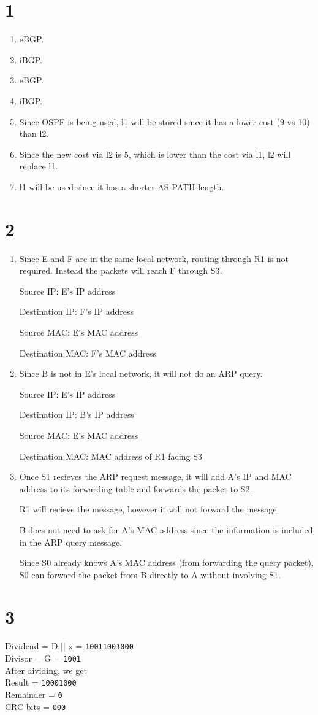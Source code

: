 \section*{1}
\begin{enumerate}[label=\alph*.]
    \item eBGP.
    \item iBGP.
    \item eBGP.
    \item iBGP.
    \item Since OSPF is being used, l1 will be stored since it has a lower cost (9 vs 10) than l2.
    \item Since the new cost via l2 is 5, which is lower than the cost via l1, l2 will replace l1.
    \item l1 will be used since it has a shorter AS-PATH length.
\end{enumerate}

\section*{2}
\begin{enumerate}[label=\alph*.]
    \item Since E and F are in the same local network, routing through R1 is not required. Instead the packets will reach F through S3.
    
    Source IP: E's IP address
    
    Destination IP: F's IP address
    
    Source MAC: E's MAC address
    
    Destination MAC: F's MAC address
    
    \item Since B is not in E's local network, it will not do an ARP query. 
    
    Source IP: E's IP address
    
    Destination IP: B's IP address
    
    Source MAC: E's MAC address
    
    Destination MAC: MAC address of R1 facing S3
    
    \item Once S1 recieves the ARP request message, it will add A's IP and MAC address to its forwarding table and forwards the packet to S2.
    
    R1 will recieve the message, however it will not forward the message.
    
    B does not need to ask for A's MAC address since the information is included in the ARP query message.
    
    Since S0 already knows A's MAC address (from forwarding the query packet), S0 can forward the packet from B directly to A without involving S1.
\end{enumerate}

\section*{3}
Dividend = D || x = \texttt{10011001000}\\
Divisor = G = \texttt{1001}\\

After dividing, we get\\
Result = \texttt{10001000}\\
Remainder = \texttt{0}\\
CRC bits = \texttt{000}\\